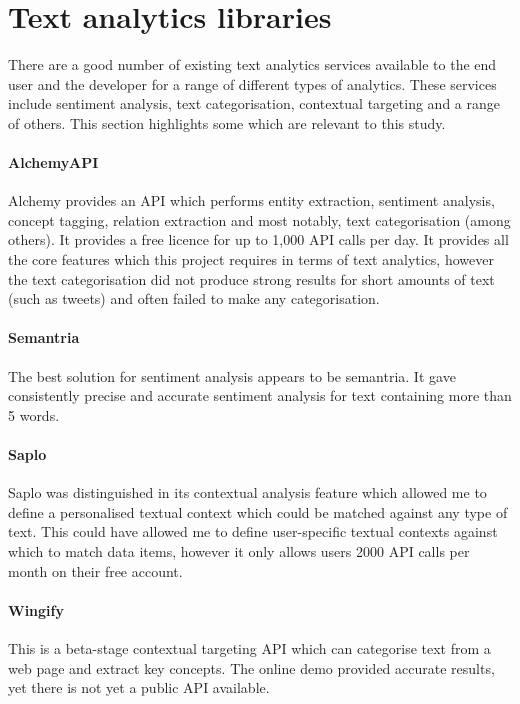 \section{Text analytics libraries}

There are a good number of existing text analytics services available to the end user and the developer for a range of different types of analytics. These services include sentiment analysis, text categorisation, contextual targeting and a range of others. This section highlights some which are relevant to this study.

\paragraph{AlchemyAPI}
Alchemy provides an API which performs entity extraction, sentiment analysis, concept tagging, relation extraction and most notably, text categorisation (among others). It provides a free licence for up to 1,000 API calls per day. It provides all the core features which this project requires in terms of text analytics, however the text categorisation did not produce strong results for short amounts of text (such as tweets) and often failed to make any categorisation.

\paragraph{Semantria}
The best solution for sentiment analysis appears to be semantria. It gave consistently precise and accurate sentiment analysis for text containing more than 5 words. 

\paragraph{Saplo}
Saplo was distinguished in its contextual analysis feature which allowed me to define a personalised textual context which could be matched against any type of text. This could have allowed me to define user-specific textual contexts against which to match data items, however it only allows users 2000 API calls per month on their free account.

\paragraph{Wingify}
This is a beta-stage contextual targeting API which can categorise text from a web page and extract key concepts. The online demo provided accurate results, yet there is not yet a public API available.

